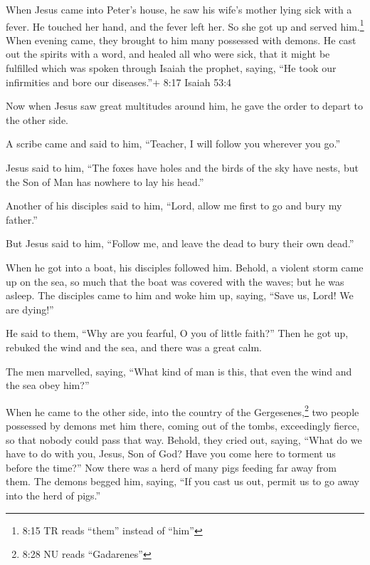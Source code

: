  When Jesus came into Peter's house, he saw his wife's
mother lying sick with a fever.  He touched her hand, and
the fever left her. So she got up and served him.\footnote{8:15 TR reads
  ``them'' instead of ``him''}  When evening came, they
brought to him many possessed with demons. He cast out the spirits with
a word, and healed all who were sick,  that it might be
fulfilled which was spoken through Isaiah the prophet, saying, ``He took
our infirmities and bore our diseases.''+ 8:17 Isaiah 53:4

 Now when Jesus saw great multitudes around him, he gave
the order to depart to the other side.

 A scribe came and said to him, ``Teacher, I will follow
you wherever you go.''

 Jesus said to him, ``The foxes have holes and the birds of
the sky have nests, but the Son of Man has nowhere to lay his head.''

 Another of his disciples said to him, ``Lord, allow me
first to go and bury my father.''

 But Jesus said to him, ``Follow me, and leave the dead to
bury their own dead.''

 When he got into a boat, his disciples followed him.
 Behold, a violent storm came up on the sea, so much that
the boat was covered with the waves; but he was asleep. 
The disciples came to him and woke him up, saying, ``Save us, Lord! We
are dying!''

 He said to them, ``Why are you fearful, O you of little
faith?'' Then he got up, rebuked the wind and the sea, and there was a
great calm.

 The men marvelled, saying, ``What kind of man is this,
that even the wind and the sea obey him?''

 When he came to the other side, into the country of the
Gergesenes,\footnote{8:28 NU reads ``Gadarenes''} two people possessed
by demons met him there, coming out of the tombs, exceedingly fierce, so
that nobody could pass that way.  Behold, they cried out,
saying, ``What do we have to do with you, Jesus, Son of God? Have you
come here to torment us before the time?''  Now there was a
herd of many pigs feeding far away from them.  The demons
begged him, saying, ``If you cast us out, permit us to go away into the
herd of pigs.''

